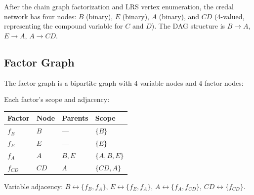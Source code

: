 \documentclass[11pt]{article}
\begin{document}
After the chain graph factorization and LRS vertex enumeration, the credal network has
four nodes: $B$ (binary), $E$ (binary), $A$ (binary), and $CD$ (4-valued, representing
the compound variable for $C$ and $D$). The DAG structure is $B \to A$, $E \to A$,
$A \to CD$.

\subsection{Factor Graph}

The factor graph is a bipartite graph with 4 variable nodes and 4 factor nodes:

\begin{center}
\end{center}

\noindent Each factor's scope and adjacency:
\begin{center}
\begin{tabular}{llll}
\toprule
\textbf{Factor} & \textbf{Node} & \textbf{Parents} & \textbf{Scope} \\
\midrule
$f_B$ & $B$ & --- & $\{B\}$ \\
$f_E$ & $E$ & --- & $\{E\}$ \\
$f_A$ & $A$ & $B, E$ & $\{A, B, E\}$ \\
$f_{CD}$ & $CD$ & $A$ & $\{CD, A\}$ \\
\bottomrule
\end{tabular}
\end{center}

Variable adjacency: $B \leftrightarrow \{f_B, f_A\}$, \;
$E \leftrightarrow \{f_E, f_A\}$, \;
$A \leftrightarrow \{f_A, f_{CD}\}$, \;
$CD \leftrightarrow \{f_{CD}\}$.
\end{document}
